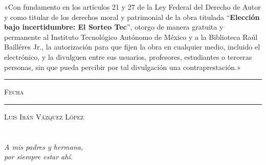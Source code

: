 \documentclass[11pt, oneside]{book}
\begin{document}

\thispagestyle{empty}

\vspace*{\fill}
\begingroup

\noindent
«Con fundamento en los artículos 21 y 27 de la Ley Federal del Derecho de Autor y como titular de los derechos moral y patrimonial de la obra titulada ``\textbf{Elección bajo incertidumbre: El Sorteo Tec}'', otorgo de manera gratuita y permanente al Instituto Tecnológico Autónomo de México y a la Biblioteca Raúl Bailléres Jr., la autorización para que fijen la obra en cualquier medio, incluido el electrónico, y la divulguen entre sus usuarios, profesores, estudiantes o terceras personas, sin que pueda percibir por tal divulgación una contraprestación.»


\centering 

\vspace{5em}

\rule[1em]{20em}{0.5pt} %

\textsc{Fecha}
 
\vspace{8em}

\rule[1em]{20em}{0.5pt} %

\textsc{Luis Irán Vázquez López}

\endgroup
\vspace*{\fill}


\pagestyle{plain}
\frontmatter

\chapter*{}
\begin{flushright}
\textit{A mis padres y hermana,\\ por siempre estar ahí.}
\end{flushright}

\end{document}
